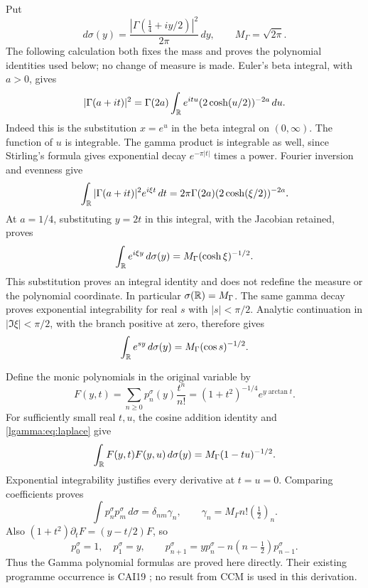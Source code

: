 \documentclass[11pt]{article}
\begin{document}
Put
\begin{equation}\label{lgamma:eq:sigma}
 d\sigma(y)=\frac{|\Gamma(\tfrac14+iy/2)|^2}{2\pi}\,dy,
 \qquad M_\Gamma=\sqrt{2\pi}.
\end{equation}
The following calculation both fixes the mass and proves the polynomial
identities used below; no change of measure is made.
Euler's beta integral, with $a>0$, gives
\[
 |\Gamma(a+it)|^2
 =\Gamma(2a)\int_{\mathbb R}e^{itu}(2\cosh(u/2))^{-2a}\,du.
\]
Indeed this is the substitution $x=e^u$ in the beta integral on
$(0,\infty)$.  The function of $u$ is integrable.  The gamma product is
integrable as well, since Stirling's formula gives exponential decay
$e^{-\pi|t|}$ times a power.  Fourier inversion and evenness give
\[
 \int_{\mathbb R}|\Gamma(a+it)|^2e^{i\xi t}\,dt
 =2\pi\Gamma(2a)(2\cosh(\xi/2))^{-2a}.
\]
At $a=1/4$, substituting $y=2t$ in this integral, with the Jacobian
retained, proves
\begin{equation}\label{lgamma:eq:transform}
 \int_{\mathbb R}e^{i\xi y}\,d\sigma(y)
 =M_\Gamma(\cosh\xi)^{-1/2}.
\end{equation}
This substitution proves an integral identity and does not redefine the
measure or the polynomial coordinate.  In particular
$\sigma(\mathbb R)=M_\Gamma$.  The same gamma decay proves exponential
integrability for real $s$ with $|s|<\pi/2$.  Analytic continuation in
$|\Im\xi|<\pi/2$, with the branch positive at zero, therefore gives
\begin{equation}\label{lgamma:eq:laplace}
 \int_{\mathbb R}e^{sy}\,d\sigma(y)=M_\Gamma(\cos s)^{-1/2}.
\end{equation}

Define the monic polynomials in the original variable by
\begin{equation}\label{lgamma:eq:gen}
 F(y,t)=\sum_{n\ge0}p_n^\sigma(y)\frac{t^n}{n!}
 =(1+t^2)^{-1/4}e^{y\arctan t}.
\end{equation}
For sufficiently small real $t,u$, the cosine addition identity and
\eqref{lgamma:eq:laplace} give
\[
 \int_{\mathbb R}F(y,t)F(y,u)\,d\sigma(y)=M_\Gamma(1-tu)^{-1/2}.
\]
Exponential integrability justifies every derivative at $t=u=0$.
Comparing coefficients proves
\begin{equation}\label{lgamma:eq:norms}
 \int p_n^\sigma p_m^\sigma\,d\sigma
 =\delta_{nm}\gamma_n,
 \qquad \gamma_n=M_\Gamma n!(\tfrac12)_n.
\end{equation}
Also $(1+t^2)\partial_tF=(y-t/2)F$, so
\begin{equation}\label{lgamma:eq:monicrec}
 p_0^\sigma=1,\quad p_1^\sigma=y,\qquad
 p_{n+1}^\sigma=yp_n^\sigma-n(n-\tfrac12)p_{n-1}^\sigma.
\end{equation}
Thus the Gamma polynomial formulas are proved here directly.  Their
existing programme occurrence is CAI19 \cite{lgamma:CAI}; no result from CCM
is used in this derivation.
\end{document}
